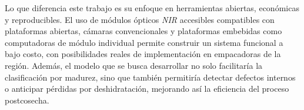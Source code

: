 Lo que diferencia este trabajo es su enfoque en herramientas abiertas, económicas y reproducibles. El uso de módulos ópticos \textit{NIR} accesibles compatibles con plataformas abiertas, cámaras convencionales y plataformas embebidas como computadoras de módulo individual permite construir un sistema funcional a bajo costo, con posibilidades reales de implementación en empacadoras de la región. Además, el modelo que se busca desarrollar no solo facilitaría la clasificación por madurez, sino que también permitiría detectar defectos internos o anticipar pérdidas por deshidratación, mejorando así la eficiencia del proceso postcosecha.